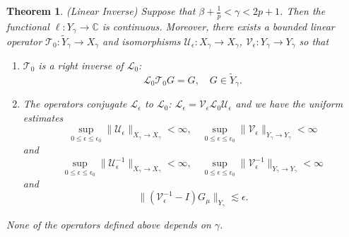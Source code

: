 \documentclass[11pt]{amsart}
\newtheorem{theorem}{Theorem}[section]
\theoremstyle{definition}
\theoremstyle{remark}
\numberwithin{equation}{section}
\newcommand{\sq}[1]{\widetilde{#1}}
\newcommand{\C}{\mathbb{C}}
\newcommand{\mc}[1]{\mathcal{#1}}
\begin{document}
\begin{theorem}\label{thm:fixed_point_linear_inverse}(Linear Inverse) Suppose that $\beta + \frac{1}{p} < \gamma < 2p + 1$. Then the functional $\ell: Y_{\gamma} \to \C$ is continuous. Moreover, there exists a bounded linear operator $\mc{T}_0: \sq{Y}_\gamma \to X_\gamma$ and isomorphisms $\mc{U}_\epsilon: X_\gamma \to X_\gamma$, $\mc{V}_\epsilon: Y_\gamma \to Y_\gamma$
so that
\begin{enumerate}
    \item $\mc{T}_0$ is a right inverse of $\mc{L}_0$:
    \begin{equation}\label{eqn:fixed_point_free_inverse}
\mc{L}_0 \mc{T}_0 G = G, \quad G \in \sq{Y}_\gamma.
\end{equation}
    \item The operators conjugate $\mc{L}_\epsilon$ to $\mc{L}_0$: $\mc{L}_\epsilon = \mc{V}_\epsilon \mc{L}_0 \mc{U}_\epsilon$ and we have the uniform estimates 
    \[\sup_{0 \leq \epsilon \leq \epsilon_0}\|\mc{U}_{\epsilon}\|_{X_\gamma \to X_\gamma} < \infty, \quad \sup_{0 \leq \epsilon \leq \epsilon_0}\|\mc{V}_{\epsilon}\|_{Y_\gamma \to Y_\gamma} < \infty\]
    and
    \[\sup_{0 \leq \epsilon \leq \epsilon_0}\|\mc{U}_{\epsilon}^{-1}\|_{X_\gamma \to X_\gamma} < \infty, \quad \sup_{0 \leq \epsilon \leq \epsilon_0}\|\mc{V}_{\epsilon}^{-1}\|_{Y_\gamma \to Y_\gamma} < \infty\]
    and 
    \begin{equation}\label{eqn:fixed_point_residual_transport}
\|(\mc{V}_\epsilon^{-1} - I)G_\mu\|_{Y_\gamma} \lesssim \epsilon.
\end{equation}
\end{enumerate}
None of the operators defined above depends on $\gamma$.
\end{theorem}
\end{document}
